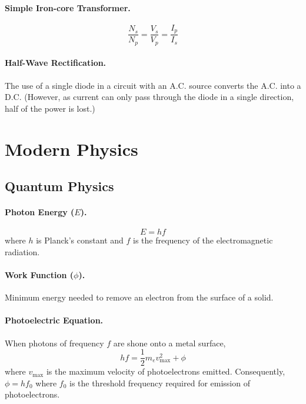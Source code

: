 \documentclass{article}
\begin{document}
\paragraph{Simple Iron-core Transformer.} \begin{equation}
\frac{N_s}{N_p} = \frac{V_s}{V_p} = \frac{I_p}{I_s}
\end{equation}

\paragraph{Half-Wave Rectification.} The use of a single diode in a circuit with an A.C. source converts the A.C. into a D.C. (However, as current can only pass through the diode in a single direction, half of the power is lost.)

\section{Modern Physics}

\subsection{Quantum Physics}

\paragraph{Photon Energy ($E$).} \begin{equation}
E = hf
\end{equation} where $h$ is Planck's constant and $f$ is the frequency of the electromagnetic radiation.

\paragraph{Work Function ($\phi$).} Minimum energy needed to remove an electron from the surface of a solid.

\paragraph{Photoelectric Equation.} When photons of frequency $f$ are shone onto a metal surface, \begin{equation}
hf = \frac{1}{2}m_ev_{\text{max}}^2 + \phi
\end{equation} where $v_{\text{max}}$ is the maximum velocity of photoelectrons emitted. Consequently, $\phi = hf_0$ where $f_0$ is the threshold frequency required for emission of photoelectrons.
\end{document}
